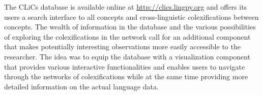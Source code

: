 The CLiCs database is available online at \url{http://clics.lingpy.org} and offers its users a search interface to all concepts and cross-linguistic colexifications between concepts. The wealth of information in the database and the various possibilities of exploring the colexifications in the network call for an additional component that makes potentially interesting observations more easily accessible to the researcher. The idea was to equip the database with a visualization component that provides various interactive functionalities and enables users to navigate through the networks of colexifications while at the same time providing more detailed information on the actual language data. 
\nocite{Wold2009,Key2007}

